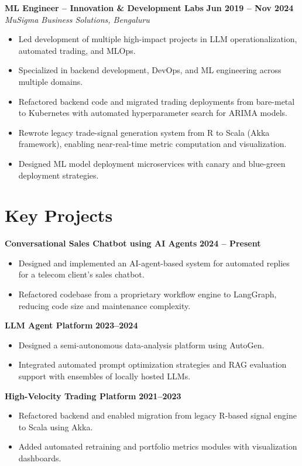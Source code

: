 \documentclass[11pt]{article}
\begin{document}
\textbf{ML Engineer – Innovation \& Development Labs} \hfill \textbf{Jun 2019 – Nov 2024}\\
\textit{MuSigma Business Solutions, Bengaluru}
\begin{itemize}[leftmargin=*,nosep]
\item Led development of multiple high-impact projects in LLM operationalization, automated trading, and MLOps.
\item Specialized in backend development, DevOps, and ML engineering across multiple domains.
\item Refactored backend code and migrated trading deployments from bare-metal to Kubernetes with automated hyperparameter search for ARIMA models.
\item Rewrote legacy trade-signal generation system from R to Scala (Akka framework), enabling near-real-time metric computation and visualization.
\item Designed ML model deployment microservices with canary and blue-green deployment strategies.
\end{itemize}

\section{Key Projects}
\textbf{Conversational Sales Chatbot using AI Agents} \hfill \textbf{2024 – Present}\\
\begin{itemize}[leftmargin=*,nosep]
\item Designed and implemented an AI-agent-based system for automated replies for a telecom client's sales chatbot.
\item Refactored codebase from a proprietary workflow engine to LangGraph, reducing code size and maintenance complexity.
\end{itemize}

\textbf{LLM Agent Platform} \hfill \textbf{2023–2024}\\
\begin{itemize}[leftmargin=*,nosep]
\item Designed a semi-autonomous data-analysis platform using AutoGen.
\item Integrated automated prompt optimization strategies and RAG evaluation support with ensembles of locally hosted LLMs.
\end{itemize}

\textbf{High-Velocity Trading Platform} \hfill \textbf{2021–2023}\\
\begin{itemize}[leftmargin=*,nosep]
\item Refactored backend and enabled migration from legacy R-based signal engine to Scala using Akka.
\item Added automated retraining and portfolio metrics modules with visualization dashboards.
\end{itemize}
\end{document}
